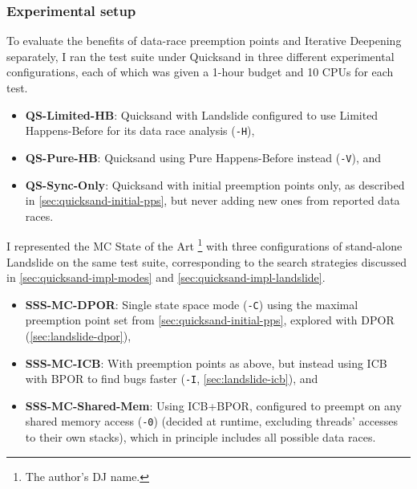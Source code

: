 \subsubsection{Experimental setup}
\label{sec:quicksand-expt-setup}

To evaluate the benefits of data-race preemption points and Iterative Deepening separately,
I ran the test suite under Quicksand in three different experimental configurations,
each of which was given a 1-hour budget and 10 CPUs for each test.

\begin{itemize}
	\item {\bf QS-Limited-HB}: Quicksand with Landslide configured to use Limited Happens-Before for its data race analysis ({\tt -H}),
	\item {\bf QS-Pure-HB}: Quicksand using Pure Happens-Before instead ({\tt -V}), and
	\item {\bf QS-Sync-Only}: Quicksand with initial preemption points only,
		as described in \cref{sec:quicksand-initial-pps},
		but never adding new ones from reported data races.
\end{itemize}

I represented the MC State of the Art%
\footnote{The author's DJ name.}
with three configurations of stand-alone Landslide on the same test suite,
corresponding to the search strategies discussed in \cref{sec:quicksand-impl-modes} and \cref{sec:quicksand-impl-landslide}.

\begin{itemize}
	\item {\bf SSS-MC-DPOR}: Single state space mode ({\tt -C})
		using the maximal preemption point set from \cref{sec:quicksand-initial-pps},
		explored with DPOR (\cref{sec:landslide-dpor}),
        \item {\bf SSS-MC-ICB}: With preemption points as above,
		but instead using ICB \cite{chess-icb} with BPOR \cite{bpor} to find bugs faster
		({\tt -I}, \cref{sec:landslide-icb}), and
        \item {\bf SSS-MC-Shared-Mem}:
		Using ICB+BPOR, configured to preempt on any shared memory access ({\tt -0})
                (decided at runtime, excluding threads' accesses to their own stacks),
                which in principle includes all possible data races.
\end{itemize}


